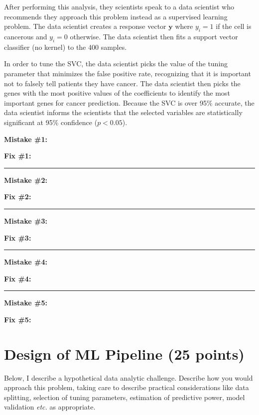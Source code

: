 \documentclass[12pt]{article}
\newcommand{\by}{\bm{y}}
\begin{document}
    After performing this analysis, they scientists speak to a data scientist who recommends they approach this problem instead
    as a supervised learning problem. The data scientist creates a response vector $\by$ where $y_i = 1$ if the cell is cancerous and $y_i = 0$
    otherwise. The data scientist then fits a support vector classifier (no kernel) to the 400 samples. 

    In order to tune the SVC, the data scientist picks the value of the tuning parameter that minimizes the false positive rate, recognizing that
    it is important not to falsely tell patients they have cancer.
    The data scientist then picks the genes with the most positive values of the coefficients to identify the most important genes for cancer 
    prediction. Because the SVC is over 95\% accurate, the data scientist informs the scientists that the selected variables are statistically
    significant at 95\% confidence ($p < 0.05$).
    \clearpage 

\textbf{Mistake \#1: }

\vfill 

\textbf{Fix \#1: }

\vfill 
\hrule 


\textbf{Mistake \#2: }

\vfill 

\textbf{Fix \#2: }

\vfill 

\hrule 

\textbf{Mistake \#3: }

\vfill 

\textbf{Fix \#3: }

\vfill 

\hrule


\textbf{Mistake \#4: }

\vfill 

\textbf{Fix \#4: }

\vfill 

\hrule 

\textbf{Mistake \#5: }

\vfill 

\textbf{Fix \#5: }

\vfill 

\clearpage



\section*{Design of ML Pipeline (25 points)}
Below, I describe a hypothetical data analytic challenge. Describe how you would approach this problem, taking care to describe practical considerations like data splitting, selection of tuning parameters, estimation of predictive power, model validation \emph{etc.} as appropriate. 
\end{document}
